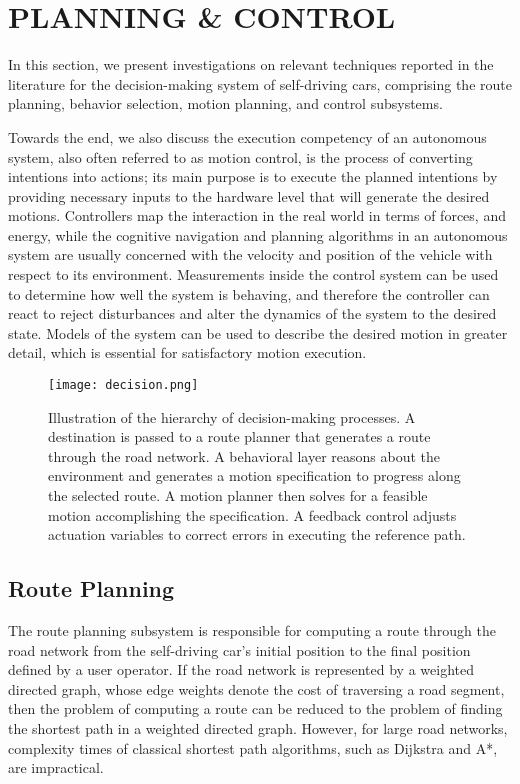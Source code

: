 \section{PLANNING \& CONTROL}

In this section, we present investigations on relevant techniques reported in
the literature for the decision-making system of self-driving cars, comprising
the route planning, behavior selection, motion planning, and control subsystems.

Towards the end, we also discuss the execution competency of an autonomous
system, also often referred to as motion control, is the process of converting
intentions into actions; its main purpose is to execute the planned intentions
by providing necessary inputs to the hardware level that will generate the
desired motions. Controllers map the interaction in the real world in terms of
forces, and energy, while the cognitive navigation and planning algorithms in an
autonomous system are usually concerned with the velocity and position of the
vehicle with respect to its environment. Measurements inside the control system
can be used to determine how well the system is behaving, and therefore the
controller can react to reject disturbances and alter the dynamics of the system
to the desired state. Models of the system can be used to describe the desired
motion in greater detail, which is essential for satisfactory motion execution.

\begin{figure}[h]
    \centering
    \texttt{[image: decision.png]}
    \caption{Illustration  of  the  hierarchy  of  decision-making processes.  A  destination  is  passed  to  a  route  planner  that generates  a  route  through  the  road  network.  A  behavioral layer  reasons  about  the  environment  and  generates  a  motion specification  to  progress  along  the  selected  route.  A  motion planner  then  solves  for  a  feasible  motion  accomplishing  the specification. A feedback control adjusts actuation variables to correct errors in executing the reference path. }
    \label{fig:lidar}
\end{figure}

\subsection{Route Planning}

The route planning subsystem is responsible for computing a route through the
road network from the self-driving car’s initial position to the final position
defined by a user operator. If the road network is represented by a weighted
directed graph, whose edge weights denote the cost of traversing a road segment,
then the problem of computing a route can be reduced to the problem of finding
the shortest path in a weighted directed graph. However, for large road
networks, complexity times of classical shortest path algorithms, such as
Dijkstra and A*, are impractical.

